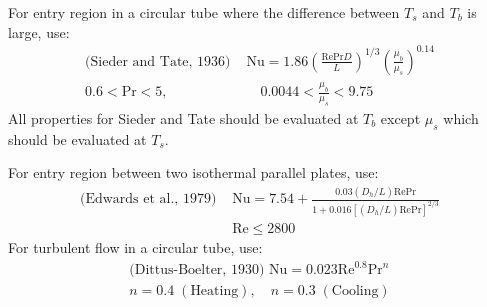 \documentclass[10pt]{article}
\begin{document}
\begin{multicols*}{2}
For entry region in a circular tube where the difference between $T_s$ and $T_b$ is large, use:
\vspace{-0.3cm}
\begin{align*}
    \text{(Sieder and Tate, 1936) } &\text{Nu} = 1.86\left(\frac{\text{Re} \text{Pr} D}{L}\right)^{1/3} \left(\frac{\mu_b}{\mu_s}\right)^{0.14} \\
    0.6 < \text{Pr} < 5, &\quad 0.0044 < \frac{\mu_b}{\mu_s} < 9.75
\end{align*}
All properties for Sieder and Tate should be evaluated at $T_b$ except $\mu_s$ which should be evaluated at $T_s$.

For entry region between two isothermal parallel plates, use:
\vspace{-0.3cm}
\begin{align*}
    \text{(Edwards et al., 1979) } &\text{Nu} = 7.54 + \frac{0.03(D_h/L) \text{Re} \text{Pr}}{1 + 0.016[(D_h/L) \text{Re} \text{Pr}]^{2/3}} \\
    &\text{Re} \leq 2800
\end{align*}
For turbulent flow in a circular tube, use:
\vspace{-0.3cm}
\begin{align*}
    \text{(Dittus-Boelter, 1930) } \text{Nu} = 0.023 \text{Re}^{0.8} \text{Pr}^{n}  \\
    n = 0.4 \; (\text{Heating}), \quad n = 0.3 \; (\text{Cooling}) 
\end{align*}
\end{multicols*}
\end{document}
